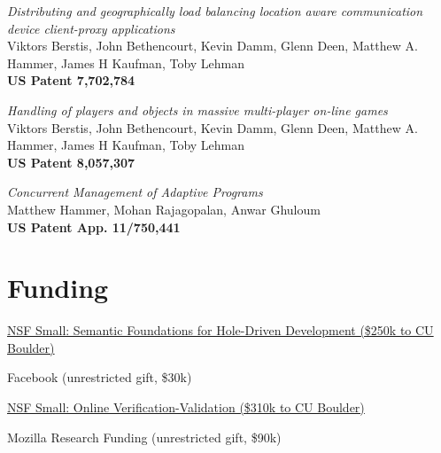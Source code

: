 \documentclass[10pt,letterpaper]{article}
\renewenvironment{itemize}{
  \begin{list}{}{
    \setlength{\leftmargin}{1.5em}
    \setlength{\itemsep}{0.25em}
    \setlength{\parskip}{0pt}
    \setlength{\parsep}{0.25em}
  }
}{
  \end{list}
}
\begin{document}
\begin{itemize}

  
\item
\textit{Distributing and geographically load balancing location aware communication device client-proxy applications}
\\
  Viktors Berstis, John Bethencourt, Kevin Damm, Glenn Deen, Matthew A. Hammer, James H Kaufman, Toby Lehman
\\
\textbf{US Patent 7,702,784}

\item
\textit{Handling of players and objects in massive multi-player on-line games}
\\
  Viktors Berstis, John Bethencourt, Kevin Damm, Glenn Deen, Matthew A. Hammer, James H Kaufman, Toby Lehman
\\
\textbf{US Patent 8,057,307}

\item
\textit{Concurrent Management of Adaptive Programs}
\\
Matthew Hammer, Mohan Rajagopalan, Anwar Ghuloum
\\
\textbf{US Patent App. 11/750,441}

\end{itemize}

\section*{Funding}
\begin{itemize}
\item \href{https://www.nsf.gov/awardsearch/showAward?AWD_ID=1817145}
  {NSF Small: Semantic Foundations for Hole-Driven Development (\$250k to CU Boulder)}

\item Facebook (unrestricted gift, \$30k)

\item \href{https://www.nsf.gov/awardsearch/showAward?AWD_ID=1619282}
  {NSF Small: Online Verification-Validation (\$310k to CU Boulder)}

\item Mozilla Research Funding (unrestricted gift, \$90k)
\end{itemize}
\end{document}
